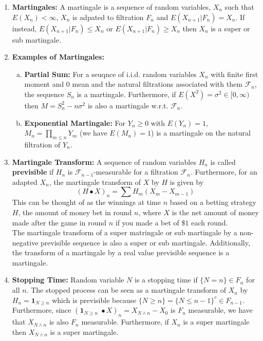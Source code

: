 \documentclass{article}
\begin{document}
\begin{enumerate}
    \item \textbf{Martingales:} A martingale is a sequence of random variables, \(X_n\) such that \(E(X_n) < \infty\), \(X_n\) is adpated to filtration \(F_n\) and \(E(X_{n+1}|F_n) = X_n\). If instead, \(E(X_{n+1}|F_n) \leq X_n\) or \(E(X_{n+1}|F_n) \geq X_n\) then \(X_n\) is a super or sub martingale.
    \item \textbf{Examples of Martingales:}
        \begin{enumerate}[a.]
            \item \textbf{Partial Sum:} For a seuqnce of i.i.d. random variables \(X_n\) with finite first moment and 0 mean and the natural filtrations associated with them \(\mathcal{F}_n\), the sequence \(S_n\) is a martingale. Furthermore, if \(E(X^2) = \sigma^2 \in [0, \infty)\) then \(M = S^2_n - n \sigma^2\) is also a martingale w.r.t. \(\mathcal{F}_n\).

            \item \textbf{Exponential Martingale:} For \(Y_n \geq 0\) with \(E(Y_n)= 1\), \(M_n = \prod_{m\leq n} Y_m\) (we have \(E(M_n) = 1\)) is a martingale on the natural filtration of \(Y_n\).
        \end{enumerate} 

    \item \textbf{Martingale Transform:} A sequence of random variables \(H_n\) is called \textbf{previsible} if \(H_n\) is \(\mathcal{F}_{n-1}\)-measurable for a filtration \(\mathcal{F}_n\). Furthermore, for an adapted \(X_n\), the martingale transform of \(X\) by \(H\) is given by
    \[
    (H \bullet X)_n = \sum H_m(X_m - X_{m-1})
    \]
    This can be thought of as the winnings at time \(n\) based on a betting strategy \(H\), the amount of money bet in round \(n\), where \(X\) is the net amount of money made after the game in round \(n\) if you made a bet of \(\$1\) each round.\\

    The martingale transform of a super matringale or sub martingale by a non-negative previsible sequence is also a super or sub martingale. Additionally, the transform of a martingale by a real value previsible sequence is a martingale.

    \item \textbf{Stopping Time:} Random variable \(N\) is a stopping time if \(\{N = n\} \in F_n\) for all \(n\). The stopped process can be seen as a martingale transform of \(X_n\) by \(H_n = \textbf{1}_{N\geq n}\) which is previsible because \(\{N\geq n\} = \{N \leq n -1\}^c \in F_{n-1}\). Furthermore, since \((\textbf{1}_{N\geq n} \;\bullet X)_n = X_{N \wedge n} - X_0\) is \(F_n\) measurable, we have that \(X_{N \wedge n}\) is also \(F_n\) measurable. Furthermore, if \(X_n\) is a super martingale then \(X_{N \wedge n}\) is a super martingale.


\end{enumerate}
\end{document}
